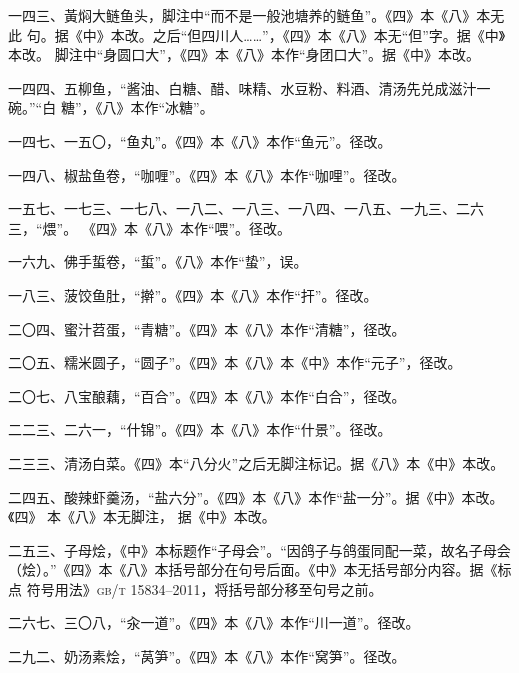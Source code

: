 \begin{list}{}
一四三、黃焖大鲢鱼头，脚注中“而不是一般池塘养的鲢鱼”。《四》本《八》本无此
句。据《中》本改。之后“但四川人……”，《四》本《八》本无“但”字。据《中》本改。
脚注中“身圆口大”，《四》本《八》本作“身团口大”。据《中》本改。

一四四、五柳鱼，“酱油、白糖、醋、味精、水豆粉、料酒、清汤先兑成滋汁一碗。”“白
糖”，《八》本作“冰糖”。

一四七、一五〇，“鱼丸”。《四》本《八》本作“鱼元”。径改。

一四八、椒盐鱼卷，“咖喱”。《四》本《八》本作“咖哩”。径改。

一五七、一七三、一七八、一八二、一八三、一八四、一八五、一九三、二六三，“煨”。
《四》本《八》本作“喂”。径改。

一六九、佛手蜇卷，“蜇”。《八》本作“蛰”，误。

一八三、菠饺鱼肚，“擀”。《四》本《八》本作“扞”。径改。

二〇四、蜜汁苕蛋，“青糖”。《四》本《八》本作“清糖”，径改。

二〇五、糯米圆子，“圆子”。《四》本《八》本《中》本作“元子”，径改。

二〇七、八宝酿藕，“百合”。《四》本《八》本作“白合”，径改。

二二三、二六一，“什锦”。《四》本《八》本作“什景”。径改。

二三三、清汤白菜。《四》本“八分火”之后无脚注标记。据《八》本《中》本改。

二四五、酸辣虾羹汤，“盐六分”。《四》本《八》本作“盐一分”。据《中》本改。《四》
本《八》本无脚注{\footnotesize{}}，
据《中》本改。

二五三、子母烩，《中》本标题作“子母会”。“因鸽子与鸽蛋同配一菜，故名子母会
（烩）。”《四》本《八》本括号部分在句号后面。《中》本无括号部分内容。据《标点
符号用法》\textsc{gb/t 15834--2011}，将括号部分移至句号之前。

二六七、三〇八，“汆一道”。《四》本《八》本作“川一道”。径改。

二九二、奶汤素烩，“莴笋”。《四》本《八》本作“窝笋”。径改。

\end{list}
\endgroup%

